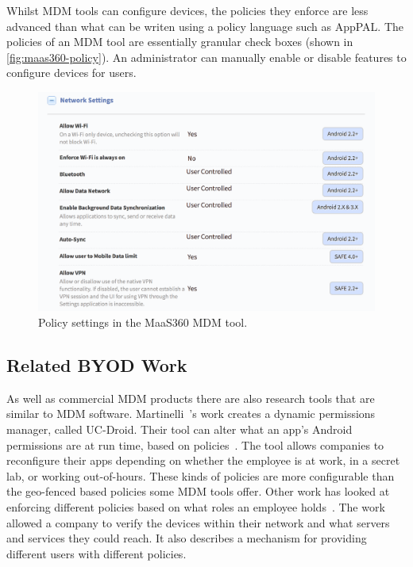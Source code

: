 \documentclass[thesis.tex]{subfiles}
\begin{document}
Whilst \ac{MDM} tools can configure devices, the policies they enforce are less
advanced than what can be writen using a policy language such as AppPAL. The
policies of an \ac{MDM} tool are essentially granular check boxes (shown in
\autoref{fig:maas360-policy}). An administrator can manually enable or disable features to
configure devices for users.

\begin{figure}
  \centering
  \includegraphics[width=\textwidth]{figures/maas360-policy.png}
  \caption{Policy settings in the MaaS360 MDM tool.}
  \label{fig:maas360-policy}
\end{figure}

\subsection{Related BYOD Work}

As well as commercial \ac{MDM} products there are also research tools
that are similar to \ac{MDM} software. Martinelli~\etal{}'s work
creates a dynamic permissions manager, called UC-Droid. Their tool can
alter what an app's Android permissions are at run time, based on
policies~\cite{martinelli_enhancing_2016}.  The tool allows companies
to reconfigure their apps depending on whether the employee is at
work, in a secret lab, or working out-of-hours. These kinds of
policies are more configurable than the geo-fenced based policies some
\ac{MDM} tools offer. Other work has looked at enforcing different
policies based on what roles an employee
holds~\cite{costantino_towards_2013}. The work allowed a company to
verify the devices within their network and what servers and services
they could reach. It also describes a mechanism for providing
different users with different policies.
\end{document}
